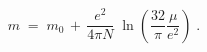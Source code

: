 \begin{equation}\label{eq:mr}
m \;=\; m_0 \,+\, \frac{e^2}{4 \pi N} \;\ln(\frac{32}{\pi} \frac{\mu}{e^2})\;.
\end{equation}

